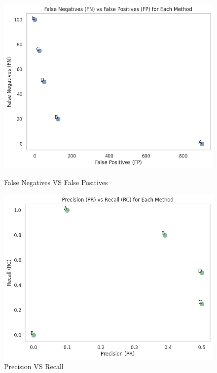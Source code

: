 \documentclass{article}
\begin{document}
\begin{figure}[H]
	\centering
	\begin{minipage}{0.45\textwidth}
		\centering
		\includegraphics[width=\textwidth]{images/FN-FP.png}
		\caption{False Negatives VS False Positives}
		\label{fig:FN-FP}
	\end{minipage}\hfill
	\begin{minipage}{0.45\textwidth}
		\centering
		\includegraphics[width=\textwidth]{images/PR-RC.png}
		\caption{Precision VS Recall}
		\label{fig:PR-RC}
	\end{minipage}
	\begin{minipage}{0.45\textwidth}

\end{minipage}
\end{figure}
\end{document}

